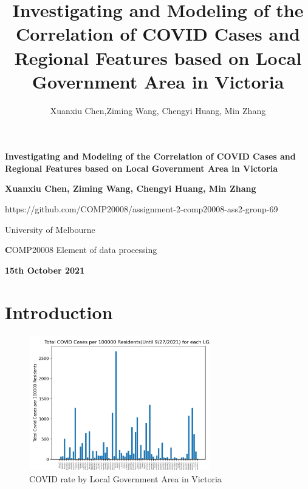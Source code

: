 \documentclass[a4, 11pt]{article}
\title{
  \textbf{Investigating and Modeling of the Correlation of COVID Cases and Regional Features based on Local Government Area in Victoria}\\
  }
\author{Xuanxiu Chen,Ziming Wang, Chengyi Huang, Min Zhang}
\date{}
\begin{document}
\thispagestyle{empty}
    \begin{center}
    \parbox[t][1cm][t]{\textwidth}{
    \begin{center}  \end{center} }


    \parbox[t][13cm][c]{\textwidth}{\huge
    \begin{center} {\textbf{\textsf Investigating and Modeling of the Correlation of COVID Cases and Regional Features based on Local Government Area in Victoria }}\end{center} }


    \parbox[t][3cm][b]{\textwidth}{
    \begin{center} {\large{\textbf{Xuanxiu Chen, Ziming Wang, Chengyi Huang, Min Zhang} }} \end{center} }
 \begin{center} https://github.com/COMP20008/assignment-2-comp20008-ass2-group-69\end{center}
    \parbox[t][2cm][c]{\textwidth}{ {\large
    \begin{center}
      University of Melbourne
    \end{center}}
\begin{center} {\textbf COMP20008 Element of data processing}\end{center} }

    \parbox[t][2cm][b]{\textwidth}{
    \begin{center} {\large\textbf{\textsf 15th October 2021}} \end{center} }
    \end{center}

\newpage
\section{Introduction}
\begin{figure}[h]
    \centering
    \includegraphics[width=0.7\textwidth]{graph/covidBarChart.png}
    \caption{COVID rate by Local Government Area in Victoria}
    \label{fig:my_label}
\end{figure}
\end{document}
